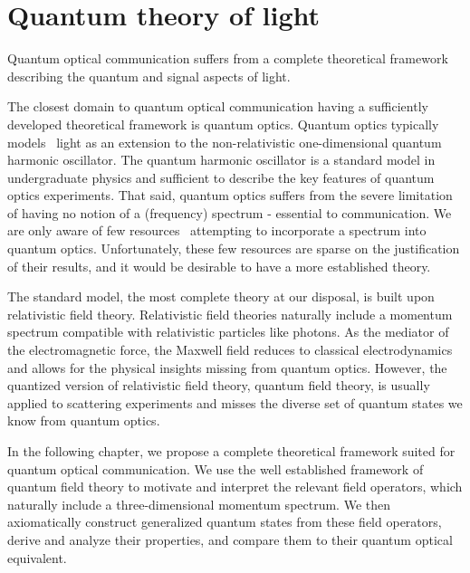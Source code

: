 \chapter{Quantum theory of light}

Quantum optical communication suffers from a complete theoretical framework describing the quantum and signal aspects of light.

The closest domain to quantum optical communication having a sufficiently developed theoretical framework is quantum optics.
Quantum optics typically models~\cite{Fox2006,Gerry2005,Haroche2006,Meystre2007} light as an extension to the non-relativistic one-dimensional quantum harmonic oscillator.
The quantum harmonic oscillator is a standard model in undergraduate physics and sufficient to describe the key features of quantum optics experiments.
That said, quantum optics suffers from the severe limitation of having no notion of a (frequency) spectrum - essential to communication.
We are only aware of few resources~\cite{Barnett2002,Shapiro2009,Loudon2000} attempting to incorporate a spectrum into quantum optics.
Unfortunately, these few resources are sparse on the justification of their results, and it would be desirable to have a more established theory.

The standard model, the most complete theory at our disposal, is built upon relativistic field theory.
Relativistic field theories naturally include a momentum spectrum compatible with relativistic particles like photons.
As the mediator of the electromagnetic force, the Maxwell field reduces to classical electrodynamics and allows for the physical insights missing from quantum optics.
However, the quantized version of relativistic field theory, quantum field theory, is usually applied to scattering experiments and misses the diverse set of quantum states we know from quantum optics.

In the following chapter, we propose a complete theoretical framework suited for quantum optical communication.
We use the well established framework of quantum field theory to motivate and interpret the relevant field operators, which naturally include a three-dimensional momentum spectrum.
We then axiomatically construct generalized quantum states from these field operators, derive and analyze their properties, and compare them to their quantum optical equivalent.
